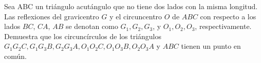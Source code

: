 Sea ABC un triángulo acutángulo que no tiene dos lados con la misma longitud.
Las reflexiones del gravicentro $G$ y el circuncentro $O$ de $ABC$ con respecto a los lados $BC$, $CA$, $AB$
se denotan como $G_1, G_2, G_3$, y $O_1, O_2, O_3$, respectivamente. Demuestra que los circuncírculos de los
triángulos $G_1G_2C, G_1G_3B, G_2G_3A, O_1O_2C, O_1O_3B, O_2O_3A$ y $ABC$ tienen un punto en común.